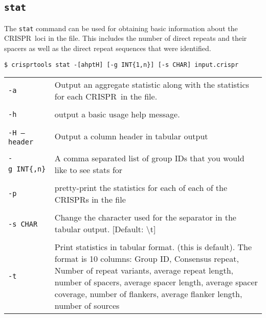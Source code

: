 \documentclass[11pt]{article} %
\newcommand{\crispr}{CRISPR}
\newcommand{\optionflag}[1]{\texttt{-#1}}
\newcommand{\optionflagarg}[2]{\optionflag{#1}\ \texttt{#2}}
\newcommand{\longoptionflag}[1]{\texttt{--#1}}
\begin{document}
\subsection{\lstinline$stat$}
\label{sec:ctstat}
The \lstinline$stat$ command can be used for obtaining basic information about the \crispr\ loci  in the file. This includes the number of direct repeats and their spacers as well as the direct repeat sequences that were identified.
\begin{lstlisting}
$ crisprtools stat -[ahptH] [-g INT{1,n}] [-s CHAR] input.crispr
\end{lstlisting}
 \begin{longtable}{  l    p{10cm} }
\optionflag{a} &  Output an aggregate statistic along with the statistics for each \crispr\ in the file. \\  \\
 \optionflag{h} & output a basic usage help message. \\ \\
\optionflag{H}\ \longoptionflag{header} & Output a column header in tabular output \\ \\
\optionflagarg{g}{INT\{,n\}} & A comma separated list of group IDs that you would like to see stats for \\ \\
\optionflag{p} & pretty-print the statistics for each of each of the \crispr s in the file \\ \\
\optionflagarg{s}{CHAR} & Change the character used for the separator in the tabular output. [Default: \textbackslash t] \\ \\
\optionflag{t} & Print statistics in tabular format. (this is default).  The format is 10 columns:
Group ID, Consensus repeat, Number of repeat variants, average repeat length, number of spacers, average spacer length, average spacer coverage, number of flankers, average flanker length, number of sources

\end{longtable}
\end{document}

